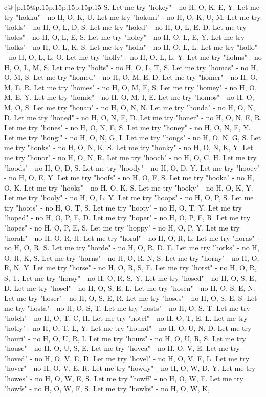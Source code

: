 \documentclass{article}
\begin{document}
{\begin{supertabular}{c@{$\;$}|p{.15\linewidth}@{}p{.15\linewidth}p{.15\linewidth}p{.15\linewidth}p{.15\linewidth}p{.15\linewidth}}
{{{S. Let me try "hokey" {-} no H, O, K, E, Y. Let me try "hokku" {-} no H, O, K, U. Let me try "hokum" {-} no H, O, K, U, M. Let me try "holds" {-} no H, O, L, D, S. Let me try "holed" {-} no H, O, L, E, D. Let me try "holes" {-} no H, O, L, E, S. Let me try "holey" {-} no H, O, L, E, Y. Let me try "holks" {-} no H, O, L, K, S. Let me try "holla" {-} no H, O, L, L. Let me try "hollo" {-} no H, O, L, L, O. Let me try "holly" {-} no H, O, L, L, Y. Let me try "holms" {-} no H, O, L, M, S. Let me try "holts" {-} no H, O, L, T, S. Let me try "homas" {-} no H, O, M, S. Let me try "homed" {-} no H, O, M, E, D. Let me try "homer" {-} no H, O, M, E, R. Let me try "homes" {-} no H, O, M, E, S. Let me try "homey" {-} no H, O, M, E, Y. Let me try "homie" {-} no H, O, M, I, E. Let me try "homos" {-} no H, O, M, O, S. Let me try "honan" {-} no H, O, N, N. Let me try "honda" {-} no H, O, N, D. Let me try "honed" {-} no H, O, N, E, D. Let me try "honer" {-} no H, O, N, E, R. Let me try "hones" {-} no H, O, N, E, S. Let me try "honey" {-} no H, O, N, E, Y. Let me try "hongi" {-} no H, O, N, G, I. Let me try "hongs" {-} no H, O, N, G, S. Let me try "honks" {-} no H, O, N, K, S. Let me try "honky" {-} no H, O, N, K, Y. Let me try "honor" {-} no H, O, N, R. Let me try "hooch" {-} no H, O, C, H. Let me try "hoods" {-} no H, O, D, S. Let me try "hoody" {-} no H, O, D, Y. Let me try "hooey" {-} no H, O, E, Y. Let me try "hoofs" {-} no H, O, F, S. Let me try "hooka" {-} no H, O, K. Let me try "hooks" {-} no H, O, K, S. Let me try "hooky" {-} no H, O, K, Y. Let me try "hooly" {-} no H, O, L, Y. Let me try "hoops" {-} no H, O, P, S. Let me try "hoots" {-} no H, O, T, S. Let me try "hooty" {-} no H, O, T, Y. Let me try "hoped" {-} no H, O, P, E, D. Let me try "hoper" {-} no H, O, P, E, R. Let me try "hopes" {-} no H, O, P, E, S. Let me try "hoppy" {-} no H, O, P, Y. Let me try "horah" {-} no H, O, R, H. Let me try "horal" {-} no H, O, R, L. Let me try "horas" {-} no H, O, R, S. Let me try "horde" {-} no H, O, R, D, E. Let me try "horks" {-} no H, O, R, K, S. Let me try "horns" {-} no H, O, R, N, S. Let me try "horny" {-} no H, O, R, N, Y. Let me try "horse" {-} no H, O, R, S, E. Let me try "horst" {-} no H, O, R, S, T. Let me try "horsy" {-} no H, O, R, S, Y. Let me try "hosed" {-} no H, O, S, E, D. Let me try "hosel" {-} no H, O, S, E, L. Let me try "hosen" {-} no H, O, S, E, N. Let me try "hoser" {-} no H, O, S, E, R. Let me try "hoses" {-} no H, O, S, E, S. Let me try "hosta" {-} no H, O, S, T. Let me try "hosts" {-} no H, O, S, T. Let me try "hotch" {-} no H, O, T, C, H. Let me try "hotel" {-} no H, O, T, E, L. Let me try "hotly" {-} no H, O, T, L, Y. Let me try "hound" {-} no H, O, U, N, D. Let me try "houri" {-} no H, O, U, R, I. Let me try "hours" {-} no H, O, U, R, S. Let me try "house" {-} no H, O, U, S, E. Let me try "hovea" {-} no H, O, V, E. Let me try "hoved" {-} no H, O, V, E, D. Let me try "hovel" {-} no H, O, V, E, L. Let me try "hover" {-} no H, O, V, E, R. Let me try "howdy" {-} no H, O, W, D, Y. Let me try "howes" {-} no H, O, W, E, S. Let me try "howff" {-} no H, O, W, F. Let me try "howfs" {-} no H, O, W, F, S. Let me try "howks" {-} no H, O, W, K, }}}
\end{supertabular}}
\end{document}
